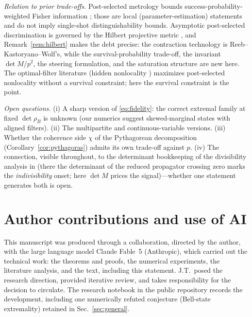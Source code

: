 \documentclass[11pt]{article}
\theoremstyle{remark}
\begin{document}
\emph{Relation to prior trade-offs.} Post-selected metrology bounds
success-probability-weighted Fisher information \cite{CFJC2014,AS2020}; those are local (parameter-estimation) statements and do
not imply single-shot distinguishability bounds. Asymptotic
post-selected discrimination is governed by the Hilbert projective
metric \cite{RKW2011,RLW2022}, and Remark~\ref{rem:hilbert} makes
the debt precise: the contraction technology is
Reeb--Kastoryano--Wolf's, while the survival-probability trade-off,
the invariant $\det M/p^{2}$, the steering formulation, and the
saturation structure are new here. The optimal-filter
literature (hidden nonlocality \cite{Gisin1996}) maximizes
post-selected nonlocality without a survival constraint; here the
survival constraint is the point.

\emph{Open questions.} (i) A sharp version of
\eqref{eq:fidelity}: the correct extremal family at fixed
$\det\rho_B$ is unknown (our numerics suggest skewed-marginal states
with aligned filters). (ii) The multipartite and
continuous-variable versions. (iii) Whether the coherence side $\chi$ of the Pythagorean
decomposition (Corollary~\ref{cor:pythagoras}) admits its own
trade-off against $p$. (iv) The connection, visible throughout, to
the determinant bookkeeping of the divisibility analysis in
\cite{indivisible} (there the determinant of the reduced propagator
crossing zero marks the \emph{indivisibility} onset; here $\det M$
prices the signal)---whether one
statement generates both is open.

\section*{Author contributions and use of AI}

This manuscript was produced through a collaboration, directed by
the author, with the large language model Claude Fable~5
(Anthropic), which carried out the technical work: the theorems and
proofs, the numerical experiments, the literature analysis, and the
text, including this statement. J.T.\ posed the research direction,
provided iterative review, and takes responsibility for the decision
to circulate. The research notebook in the public repository records
the development, including one numerically refuted conjecture
(Bell-state extremality) retained in Sec.~\ref{sec:general}.

\end{document}
